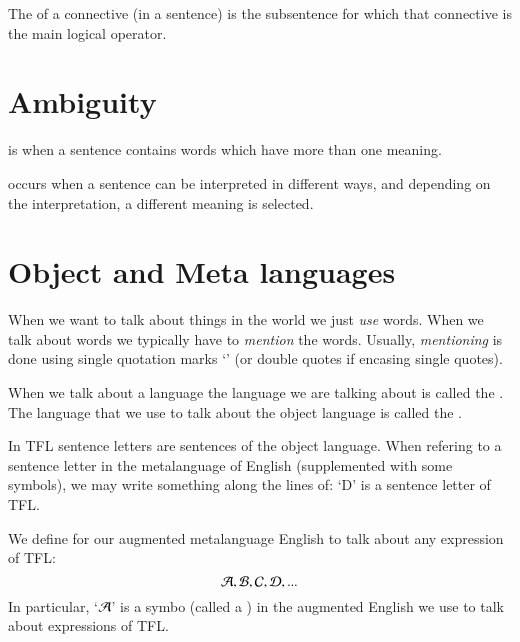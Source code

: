 \documentclass[12pt, a4paper, twoside, openright, titlepage]{book}
\begin{document}
\begin{defn}{}{}
    The  of a connective (in a sentence) is the subsentence for which that connective is the main logical operator.
\end{defn}




\section{\textsection Ambiguity}

\begin{defn}{}{}
     is when a sentence contains words which have more than one meaning.
\end{defn}

\begin{defn}{}{}
     occurs when a sentence can be interpreted in different ways, and depending on the interpretation, a different meaning is selected.
\end{defn}


\section{\textsection Object and Meta languages}

\begin{rmk}{}{}
    When we want to talk about things in the world we just \emph{use} words. When we talk about words we typically have to \emph{mention} the words. Usually, \emph{mentioning} is done using single quotation marks `' (or double quotes if encasing single quotes).
\end{rmk}


\begin{defn}{}{}
    When we talk about a language the language we are talking about is called the . The language that we use to talk about the object language is called the .
\end{defn}

\begin{rmk}{}{}
    In TFL sentence letters are sentences of the object language. When refering to a sentence letter in the metalanguage of English (supplemented with some symbols), we may write something along the lines of: `D' is a sentence letter of TFL.
\end{rmk}


\begin{defn}{}{}
    We define  for our augmented metalanguage English to talk about any expression of TFL: \begin{equation}
        \mathcal{A},\mathcal{B},\mathcal{C},\mathcal{D},...
    \end{equation}
    In particular, `$\mathcal{A}$' is a symbo (called a ) in the augmented English we use to talk about expressions of TFL.
\end{defn}
\end{document}
